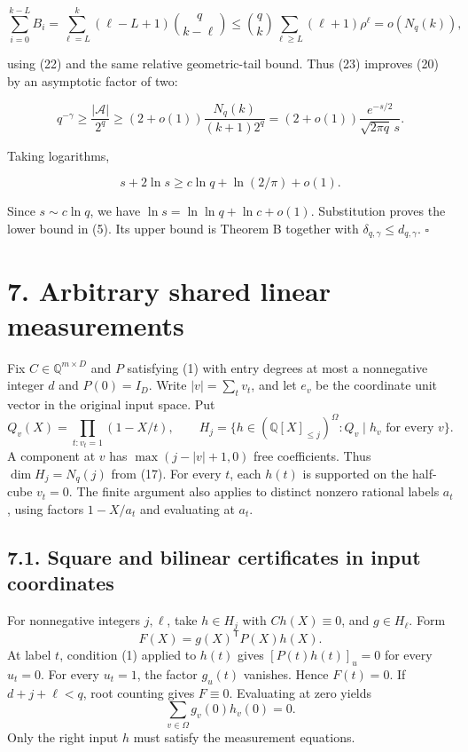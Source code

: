 \documentclass[
  10pt,
]{article}
\begin{document}
\[
 \sum_{i=0}^{k-L}B_i
 =\sum_{\ell=L}^{k}(\ell-L+1)\binom q{k-\ell}
 \le\binom qk\sum_{\ell\ge L}(\ell+1)\rho^\ell
 =o(N_q(k)),
\]

using (22) and the same relative geometric-tail bound. Thus (23) improves (20) by an asymptotic factor of two:

\[
 q^{-\gamma}\ge\frac{|\mathcal A|}{2^q}
 \ge(2+o(1))\frac{N_q(k)}{(k+1)2^q}
 =(2+o(1))\frac{e^{-s/2}}{\sqrt{2\pi q}\,s}.
\]

Taking logarithms,

\[
 s+2\ln s\ge c\ln q+\ln(2/\pi)+o(1).
\]

Since \(s\sim c\ln q\), we have \(\ln s=\ln\ln q+\ln c+o(1)\). Substitution proves the lower bound in (5). Its upper bound is Theorem B together with \(\delta_{q,\gamma}\le d_{q,\gamma}\). \(\square\)


\section{7. Arbitrary shared linear measurements}

Fix \(C\in\mathbb Q^{m\times D}\) and \(P\) satisfying (1) with entry degrees at most a nonnegative integer \(d\) and \(P(0)=I_D\).
Write \(|v|=\sum_t v_t\), and let \(e_v\) be the coordinate unit vector in the original input space. Put
\[
 Q_v(X)=\prod_{t:v_t=1}(1-X/t),\qquad
 H_j=\{h\in(\mathbb Q[X]_{\le j})^\Omega: Q_v\mid h_v \text{ for every }v\}.
\]
A component at \(v\) has \(\max(j-|v|+1,0)\) free coefficients. Thus \(\dim H_j=N_q(j)\) from (17).
For every \(t\), each \(h(t)\) is supported on the half-cube \(v_t=0\). The finite argument also applies to distinct nonzero rational labels \(a_t\), using factors \(1-X/a_t\) and evaluating at \(a_t\).

\subsection{7.1. Square and bilinear certificates in input coordinates}

For nonnegative integers \(j,\ell\), take \(h\in H_j\) with \(Ch(X)\equiv0\), and \(g\in H_\ell\). Form
\[
 F(X)=g(X)^{\mathsf T}P(X)h(X).
\]
At label \(t\), condition (1) applied to \(h(t)\) gives \([P(t)h(t)]_u=0\) for every \(u_t=0\). For every \(u_t=1\), the factor \(g_u(t)\) vanishes. Hence \(F(t)=0\). If \(d+j+\ell<q\), root counting gives \(F\equiv0\). Evaluating at zero yields
\[
 \sum_{v\in\Omega}g_v(0)h_v(0)=0. \tag{25}
\]
Only the right input \(h\) must satisfy the measurement equations.
\end{document}
